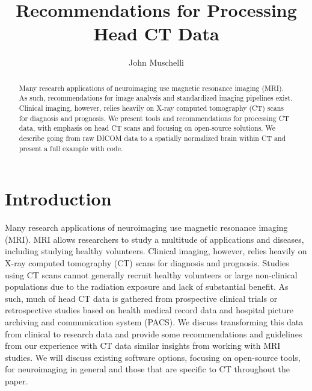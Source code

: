\documentclass[]{elsarticle} %
\begin{document}
\begin{frontmatter}

  \title{Recommendations for Processing Head CT Data}
    \author[JHSPH]{John Muschelli}
  
      \address[JHSPH]{Johns Hopkins Bloomberg School of Public Health, Department of Biostatistics, 615 N Wolfe St, Baltimore, MD, 21205}
    \address[JHMI]{Johns Hopkins Hospital, Department of Neurology, 601 N Caroline St, Baltimore, MD 21205}
    \address[BIOS]{Brain Injury Outcomes, Johns Hopkins University, 750 East Pratt Street, Baltimore, MD 21202}
  
  \begin{abstract}
  Many research applications of neuroimaging use magnetic resonance imaging (MRI). As such, recommendations for image analysis and standardized imaging pipelines exist. Clinical imaging, however, relies heavily on X-ray computed tomography (CT) scans for diagnosis and prognosis. We present tools and recommendations for processing CT data, with emphasis on head CT scans and focusing on open-source solutions. We describe going from raw DICOM data to a spatially normalized brain within CT and present a full example with code.
  \end{abstract}
  
 \end{frontmatter}

\hypertarget{introduction}{%
\section{Introduction}\label{introduction}}

Many research applications of neuroimaging use magnetic resonance imaging (MRI). MRI allows researchers to study a multitude of applications and diseases, including studying healthy volunteers. Clinical imaging, however, relies heavily on X-ray computed tomography (CT) scans for diagnosis and prognosis. Studies using CT scans cannot generally recruit healthy volunteers or large non-clinical populations due to the radiation exposure and lack of substantial benefit. As such, much of head CT data is gathered from prospective clinical trials or retrospective studies based on health medical record data and hospital picture archiving and communication system (PACS). We discuss transforming this data from clinical to research data and provide some recommendations and guidelines from our experience with CT data similar insights from working with MRI studies. We will discuss existing software options, focusing on open-source tools, for neuroimaging in general and those that are specific to CT throughout the paper.
\end{document}
